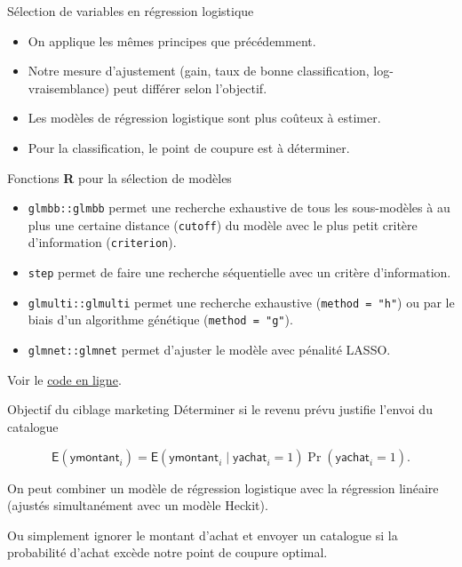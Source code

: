 \documentclass[
  ignorenonframetext,
]{beamer}
\providecommand{\tightlist}{%
  \setlength{\itemsep}{0pt}\setlength{\parskip}{0pt}}\usepackage{longtable,booktabs,array}
\begin{document}
\begin{frame}{Sélection de variables en régression logistique}
\protect\hypertarget{suxe9lection-de-variables-en-ruxe9gression-logistique}{}
\begin{itemize}
\tightlist
\item
  On applique les mêmes principes que précédemment.
\item
  Notre mesure d'ajustement (gain, taux de bonne classification,
  log-vraisemblance) peut différer selon l'objectif.
\item
  Les modèles de régression logistique sont plus coûteux à estimer.
\item
  Pour la classification, le point de coupure est à déterminer.
\end{itemize}
\end{frame}

\begin{frame}[fragile]{Fonctions \textbf{R} pour la sélection de
modèles}
\protect\hypertarget{fonctions-r-pour-la-suxe9lection-de-moduxe8les}{}
\begin{itemize}
\tightlist
\item
  \texttt{glmbb::glmbb} permet une recherche exhaustive de tous les
  sous-modèles à au plus une certaine distance (\texttt{cutoff}) du
  modèle avec le plus petit critère d'information (\texttt{criterion}).
\item
  \texttt{step} permet de faire une recherche séquentielle avec un
  critère d'information.
\item
  \texttt{glmulti::glmulti} permet une recherche exhaustive
  (\texttt{method\ =\ "h"}) ou par le biais d'un algorithme génétique
  (\texttt{method\ =\ "g"}).
\item
  \texttt{glmnet::glmnet} permet d'ajuster le modèle avec pénalité
  LASSO.
\end{itemize}

Voir le
\href{https://lbelzile.github.io/math60602/05-reglogistique.html\#s\%C3\%A9lection-de-variables-en-r\%C3\%A9gression-logistique}{code
en ligne}.
\end{frame}

\begin{frame}{Objectif du ciblage marketing}
\protect\hypertarget{objectif-du-ciblage-marketing}{}
Déterminer si le revenu prévu justifie l'envoi du catalogue

\[\mathsf{E}(\textsf{ymontant}_i) = \mathsf{E}(\textsf{ymontant}_i \mid \textsf{yachat}_i = 1)\Pr(\textsf{yachat}_i = 1).\]

On peut combiner un modèle de régression logistique avec la régression
linéaire (ajustés simultanément avec un modèle Heckit).

Ou simplement ignorer le montant d'achat et envoyer un catalogue si la
probabilité d'achat excède notre point de coupure optimal.
\end{frame}
\end{document}

